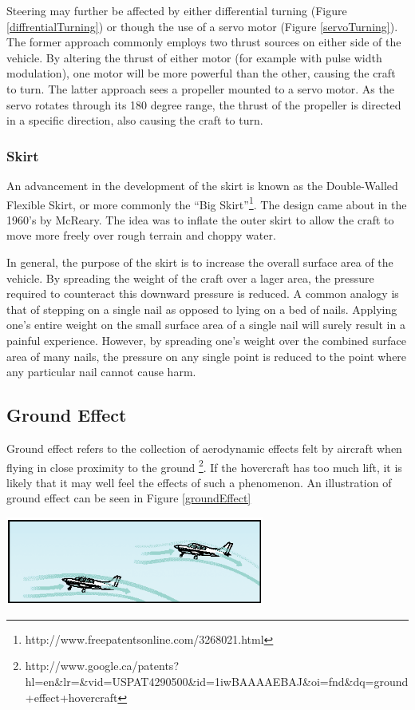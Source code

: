 Steering may further be affected by either differential turning (Figure \ref{diffrentialTurning}) or though the use of a servo motor (Figure \ref{servoTurning}). The former approach commonly employs two thrust sources on either side of the vehicle. By altering the thrust of either motor (for example with pulse width modulation), one motor will be more powerful than the other, causing the craft to turn. The latter approach sees a propeller mounted to a servo motor. As the servo rotates through its 180 degree range, the thrust of the propeller is directed in a specific direction, also causing the craft to turn.

\subsubsection{Skirt}
An advancement in the development of the skirt is known as the Double-Walled Flexible Skirt, or more commonly the “Big Skirt”\footnote{http://www.freepatentsonline.com/3268021.html}. The design came about in the 1960’s by McReary. The idea was to inflate the outer skirt to allow the craft to move more freely over rough terrain and choppy water.

In general, the purpose of the skirt is to increase the overall surface area of the vehicle. By spreading the weight of the craft over a lager area, the pressure required to counteract this downward pressure is reduced. A common analogy is that of stepping on a single nail as opposed to lying on a bed of nails. Applying one’s entire weight on the small surface area of a single nail will surely result in a painful experience. However, by spreading one’s weight over the combined surface area of many nails, the pressure on any single point is reduced to the point where any particular nail cannot cause harm.

\subsection{Ground Effect}
Ground effect refers to the collection of aerodynamic effects felt by aircraft when flying in close proximity to the ground \footnote{http://www.google.ca/patents?hl=en\&lr=\&vid=USPAT4290500\&id=1iwBAAAAEBAJ\&oi=fnd\&dq=ground+effect+hovercraft}. If the hovercraft has too much lift, it is likely that it may well feel the effects of such a phenomenon.  An illustration of ground effect can be seen in Figure \ref{groundEffect}

  \begin{minipage}{6.5in}
  \begin{center}
    \includegraphics[width=85mm]{imageSources/groundEffect.png}
  \end{center}
  \label{groundEffect}
  \end{minipage}

